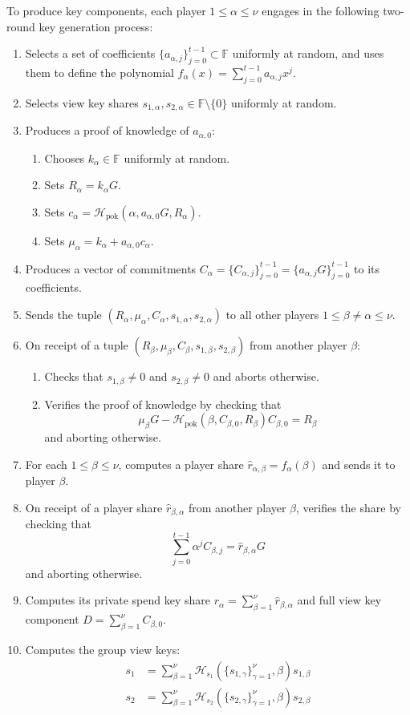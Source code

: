 \documentclass{llncs}
\newcommand{\F}{\mathbb{F}}
\newcommand{\hash}{\mathcal{H}}
\begin{document}
To produce key components, each player $1 \leq \alpha \leq \nu$ engages in the following two-round key generation process:
\begin{enumerate}
    \item Selects a set of coefficients $\{a_{\alpha,j}\}_{j=0}^{t-1} \subset \F$ uniformly at random, and uses them to define the polynomial $f_\alpha(x) = \sum_{j=0}^{t-1} a_{\alpha,j}x^j$.
    \item Selects view key shares $s_{1,\alpha},s_{2,\alpha} \in \F \setminus \{0\}$ uniformly at random.
    \item Produces a proof of knowledge of $a_{\alpha,0}$:
    \begin{enumerate}
        \item Chooses $k_\alpha \in \F$ uniformly at random.
        \item Sets $R_\alpha = k_\alpha G$.
        \item Sets $c_\alpha = \hash_{\text{pok}}(\alpha,a_{\alpha,0}G,R_\alpha)$.
        \item Sets $\mu_\alpha = k_\alpha + a_{\alpha,0}c_\alpha$.
    \end{enumerate}
    \item Produces a vector of commitments $C_\alpha = \{C_{\alpha,j}\}_{j=0}^{t-1} = \{a_{\alpha,j}G\}_{j=0}^{t-1}$ to its coefficients.
    \item Sends the tuple $(R_\alpha,\mu_\alpha,C_\alpha,s_{1,\alpha},s_{2,\alpha})$ to all other players $1 \leq \beta \neq \alpha \leq \nu$.
    \item On receipt of a tuple $(R_\beta,\mu_\beta,C_\beta,s_{1,\beta},s_{2,\beta})$ from another player $\beta$:
    \begin{enumerate}
        \item Checks that $s_{1,\beta} \neq 0$ and $s_{2,\beta} \neq 0$ and aborts otherwise.
        \item Verifies the proof of knowledge by checking that $$\mu_\beta G - \hash_{\text{pok}}(\beta,C_{\beta,0},R_\beta)C_{\beta,0} = R_\beta$$ and aborting otherwise.
    \end{enumerate}
    \item For each $1 \leq \beta \leq \nu$, computes a player share $\widehat{r}_{\alpha,\beta} = f_\alpha(\beta)$ and sends it to player $\beta$.
    \item On receipt of a player share $\widehat{r}_{\beta,\alpha}$ from another player $\beta$, verifies the share by checking that $$\sum_{j=0}^{t-1} \alpha^jC_{\beta,j} = \widehat{r}_{\beta,\alpha}G$$ and aborting otherwise.
    \item Computes its private spend key share $r_\alpha = \sum_{\beta=1}^\nu \widehat{r}_{\beta,\alpha}$ and full view key component $D = \sum_{\beta=1}^\nu C_{\beta,0}$.
    \item Computes the group view keys:
    \begin{align*}
        s_1 &= \sum_{\beta=1}^\nu \hash_{s_1}(\{s_{1,\gamma}\}_{\gamma=1}^\nu,\beta)s_{1,\beta} \\
        s_2 &= \sum_{\beta=1}^\nu \hash_{s_2}(\{s_{2,\gamma}\}_{\gamma=1}^\nu,\beta)s_{2,\beta}
    \end{align*}
\end{enumerate}
\end{document}
